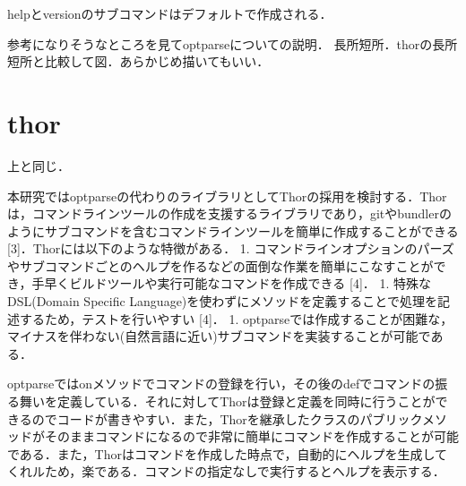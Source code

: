helpとversionのサブコマンドはデフォルトで作成される．

参考になりそうなところを見てoptparseについての説明．
長所短所．thorの長所短所と比較して図．あらかじめ描いてもいい．

\section{thor}\label{thor}

上と同じ．

本研究ではoptparseの代わりのライブラリとしてThorの採用を検討する．Thorは，コマンドラインツールの作成を支援するライブラリであり，gitやbundlerのようにサブコマンドを含むコマンドラインツールを簡単に作成することができる
{[}3{]}．Thorには以下のような特徴がある． 1.
コマンドラインオプションのパーズやサブコマンドごとのヘルプを作るなどの面倒な作業を簡単にこなすことができ，手早くビルドツールや実行可能なコマンドを作成できる
{[}4{]}． 1. 特殊なDSL(Domain Specific
Language)を使わずにメソッドを定義することで処理を記述するため，テストを行いやすい
{[}4{]}． 1.
optparseでは作成することが困難な，マイナスを伴わない(自然言語に近い)サブコマンドを実装することが可能である．

\begin{Shaded}
\begin{Highlighting}[]
\NormalTok{, }
\NormalTok{ => }
\OtherTok{#\{}\OtherTok{\}}\OtherTok{#\{}\NormalTok{help[}\NormalTok{][}\NormalTok{]}\OtherTok{\}}
\NormalTok{      \}}
\end{Highlighting}
\end{Shaded}

optparseではonメソッドでコマンドの登録を行い，その後のdefでコマンドの振る舞いを定義している．それに対してThorは登録と定義を同時に行うことができるのでコードが書きやすい．また，Thorを継承したクラスのパブリックメソッドがそのままコマンドになるので非常に簡単にコマンドを作成することが可能である．また，Thorはコマンドを作成した時点で，自動的にヘルプを生成してくれルため，楽である．コマンドの指定なしで実行するとヘルプを表示する．

